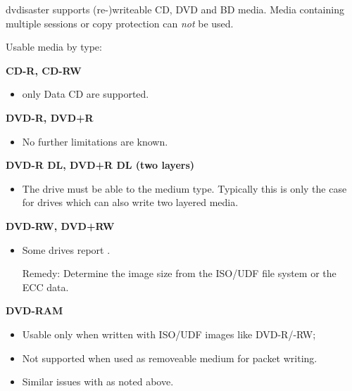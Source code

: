 {\label{qa-technical-media} dvdisaster supports (re-)writeable CD, DVD and BD media.
  Media containing multiple sessions or copy protection can {\em not} be used.

\bigskip
  
Usable media by type:

\medskip

{\bf CD-R, CD-RW}

\begin{itemize}
  \item only Data CD are supported.
\end{itemize}

\medskip

{\bf DVD-R, DVD+R}

\begin{itemize}
\item No further limitations are known.
\end{itemize}

\medskip

{\bf DVD-R DL, DVD+R DL (two layers)}

\begin{itemize}
\item The drive must be able to  the medium
  type. Typically this is only the case for drives which
  can also write two layered media.
\end{itemize}

\medskip

{\bf DVD-RW, DVD+RW}

\begin{itemize}
\item Some drives report .

  Remedy: Determine the image size from the ISO/UDF file system or the ECC data.
\end{itemize}

\medskip

{\bf DVD-RAM}

\begin{itemize}
\item Usable only when written with ISO/UDF images like DVD-R/-RW;
\item Not supported when used as removeable medium for packet writing.
\item Similar issues with  as noted above.
\end{itemize}

}
